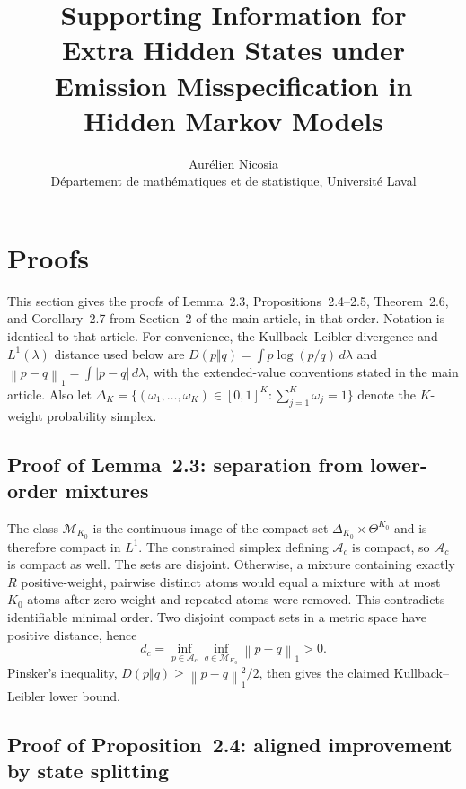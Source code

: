 \documentclass[11pt]{article}
\title{Supporting Information for\\
Extra Hidden States under Emission Misspecification in Hidden Markov Models}
\author{Aur\'elien Nicosia\\
D\'epartement de math\'ematiques et de statistique, Universit\'e Laval}
\date{}
\newcommand{\Mcal}{\mathcal{M}}
\newcommand{\Acal}{\mathcal{A}}
\newcommand{\norm}[1]{\left\lVert #1\right\rVert}
\begin{document}
\maketitle

\section{Proofs}\label{sec:proofs}

This section gives the proofs of Lemma~2.3, Propositions~2.4--2.5,
Theorem~2.6, and Corollary~2.7 from Section~2 of the main article, in that
order. Notation is identical to that article. For convenience, the
Kullback--Leibler divergence and $L^1(\lambda)$ distance used below are
$D(p\Vert q)=\int p\log(p/q)\,d\lambda$ and
$\norm{p-q}_1=\int|p-q|\,d\lambda$, with the extended-value conventions stated
in the main article. Also let
$\Delta_K=\{(\omega_1,\ldots,\omega_K)\in[0,1]^K:
\sum_{j=1}^K\omega_j=1\}$ denote the $K$-weight probability simplex.

\subsection{Proof of Lemma~2.3: separation from lower-order mixtures}

The class $\Mcal_{K_0}$ is the continuous image of the compact set
$\Delta_{K_0}\times\Theta^{K_0}$ and is therefore compact in $L^1$. The
constrained simplex defining $\Acal_c$ is compact, so $\Acal_c$ is compact as
well. The sets are disjoint. Otherwise, a mixture containing exactly $R$
positive-weight, pairwise distinct atoms would equal a mixture with at most
$K_0$ atoms after zero-weight and repeated atoms were removed. This contradicts
identifiable minimal order. Two disjoint compact sets in a metric space have
positive distance, hence
\begin{equation*}
 d_c=\inf_{p\in\Acal_c}\inf_{q\in\Mcal_{K_0}}\norm{p-q}_1>0.
\end{equation*}
Pinsker's inequality, $D(p\Vert q)\geq\norm{p-q}_1^2/2$, then gives the claimed
Kullback--Leibler lower bound.

\subsection{Proof of Proposition~2.4: aligned improvement by state splitting}
\end{document}
